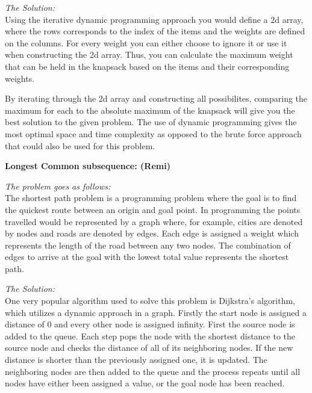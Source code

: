 \documentclass{article}
\begin{document}
\medskip

\noindent \textit{The Solution:} \\

Using the iterative dynamic programming approach you would define a 2d array,
where the rows corresponds to the index of the items and the weights are defined
on the columns. For every weight you can either choose to ignore it or use it
when constructing the 2d array. Thus, you can calculate the maximum weight
that can be held in the knapsack based on the items and their corresponding
weights.

By iterating through the 2d array and constructing all possibilites, comparing
the maximum for each to the absolute maximum of the knapsack will give you 
the best solution to the given problem. The use of dynamic programming gives
the most optimal space and time complexity as opposed to the brute force
approach that could also be used for this problem.

\bigskip

\noindent \textbf{Longest Common subsequence: (Remi)} 

\noindent \textit{The problem goes as follows:} \\

The shortest path problem is a programming problem where the goal is to find 
the quickest route between an origin and goal point. In programming the points
travelled would be represented by a graph where, for example, cities are denoted
by nodes and roads are denoted by edges. Each edge is assigned a weight which 
represents the length of the road between any two nodes. The combination of edges 
to arrive at the goal with the lowest total value represents the shortest path.

\medskip

\noindent \textit{The Solution:} \\

One very popular algorithm used to solve this problem is Dijkstra's algorithm, 
which utilizes a dynamic approach in a graph. Firstly the start node is assigned 
a distance of 0 and every other node is assigned infinity. First the source node
is added to the queue. Each step pops the node with the shortest distance to the
source node and checks the distance of all of its neighboring nodes. If the 
new distance is shorter than the previously assigned one, it is updated. The 
neighboring nodes are then added to the queue and the process repeats until 
all nodes have either been assigned a value, or the goal node has been reached.
\end{document}
